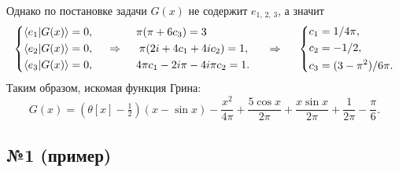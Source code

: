 Однако по постановке задачи $G(x)$ не содержит $e_{1,\, 2,\, 3}$, а значит
\begin{equation*}
    \left\{\begin{aligned}
        \langle e_1 | G(x) \rangle &= 0,
        \hspace{0.5cm} \phantom{\Rightarrow} \hspace{0.5cm}
        \pi (\pi + 6 c_3) = 3 \\
        \langle e_2 | G(x) \rangle &= 0,
        \hspace{0.5cm} \Rightarrow \hspace{0.5cm}
        \pi(2 i + 4 c_1 + 4 i c_2) =1, \\
        \langle e_3 | G(x) \rangle &= 0,
        \hspace{0.5cm} \phantom{\Rightarrow} \hspace{0.5cm}
        4 \pi c_1 - 2 i \pi  - 4 i \pi c_2 = 1.
    \end{aligned}\right.
    \hspace{0.5cm} \Rightarrow \hspace{0.5cm}
    \left\{\begin{aligned}
        c_1 &= 1/4\pi, \\
        c_2 &= -1/2, \\
        c_3 &= (3-\pi^2)/6 \pi. \\
    \end{aligned}\right.
\end{equation*}
Таким образом, искомая функция Грина:
\begin{equation*}
   G(x) =  (\theta[x] - \tfrac{1}{2}) (x - \sin x) 
    -\frac{x^2}{4\pi} + \frac{5 \cos x}{2\pi} + \frac{x \sin x}{2\pi} + \frac{1}{2\pi}-\frac{\pi}{6}.
\end{equation*}


\subsection*{№1 (пример)}


